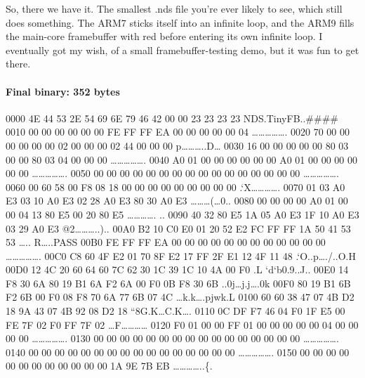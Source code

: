 \documentclass[11pt,a4paper]{article}
\let\oldparagraph\paragraph
\renewcommand{\paragraph}[1]{\oldparagraph{#1}\mbox{}}
\begin{document}
So, there we have it. The smallest .nds file you're ever likely to see,
which still does something. The ARM7 sticks itself into an infinite
loop, and the ARM9 fills the main-core framebuffer with red before
entering its own infinite loop. I eventually got my wish, of a small
framebuffer-testing demo, but it was fun to get there.

\paragraph{Final binary: 352 bytes}\label{final-binary-352-bytes}

0000 4E 44 53 2E 54 69 6E 79 46 42 00 00 23 23 23 23
NDS.TinyFB..\#\#\#\# 0010 00 00 00 00 00 00 {FE FF FF EA} 00 00 00 00 00
04 \ldots{}\ldots{}\ldots{}\ldots{}\ldots{}. 0020 70 00 00 00 00 00 00
02 00 00 00 02 44 00 00 00 p\ldots{}\ldots{}\ldots{}..D\ldots{} 0030 16
00 00 00 00 00 80 03 00 00 80 03 04 00 00 00
\ldots{}\ldots{}\ldots{}\ldots{}\ldots{}. 0040 A0 01 00 00 00 00 00 00
A0 01 00 00 00 00 00 00 \ldots{}\ldots{}\ldots{}\ldots{}\ldots{}. 0050
00 00 00 00 00 00 00 00 00 00 00 00 00 00 00 00
\ldots{}\ldots{}\ldots{}\ldots{}\ldots{}. 0060 00 60 58 00 F8 08 18 00
00 00 00 00 00 00 00 00 .`X\ldots{}\ldots{}\ldots{}\ldots{}. 0070 {01 03
A0 E3 03 10 A0 E3 02 28 A0 E3 80 30 A0 E3}
\ldots{}\ldots{}\ldots{}(\ldots{}0.. 0080 00 00 00 00 A0 01 00 00 {04 13
80 E5 00 20 80 E5} \ldots{}\ldots{}\ldots{}\ldots{}. .. 0090 {40 32 80
E5 1A 05 A0 E3 1F 10 A0 E3 03 29 A0 E3} @2\ldots{}\ldots{}\ldots{}..)..
00A0 {B2 10 C0 E0 01 20 52 E2 FC FF FF 1A} 50 41 53 53 \ldots{}..
R\ldots{}..PASS 00B0 {FE FF FF EA} 00 00 00 00 00 00 00 00 00 00 00 00
\ldots{}\ldots{}\ldots{}\ldots{}\ldots{}. 00C0 C8 60 4F E2 01 70 8F E2
17 FF 2F E1 12 4F 11 48 .`O..p\ldots{}./..O.H 00D0 12 4C 20 60 64 60 7C
62 30 1C 39 1C 10 4A 00 F0 .L `d`\textbar{}b0.9..J.. 00E0 14 F8 30 6A 80
19 B1 6A F2 6A 00 F0 0B F8 30 6B ..0j\ldots{}j.j\ldots{}.0k 00F0 80 19
B1 6B F2 6B 00 F0 08 F8 70 6A 77 6B 07 4C \ldots{}k.k\ldots{}.pjwk.L
0100 60 60 38 47 07 4B D2 18 9A 43 07 4B 92 08 D2 18
``8G.K\ldots{}C.K\ldots{}. 0110 0C DF F7 46 04 F0 1F E5 00 FE 7F 02 F0
FF 7F 02 \ldots{}F\ldots{}\ldots{}\ldots{}\ldots{} 0120 F0 01 00 00 FF
01 00 00 00 00 00 04 00 00 00 00
\ldots{}\ldots{}\ldots{}\ldots{}\ldots{}. 0130 00 00 00 00 00 00 00 00
00 00 00 00 00 00 00 00 \ldots{}\ldots{}\ldots{}\ldots{}\ldots{}. 0140
00 00 00 00 00 00 00 00 00 00 00 00 00 00 00 00
\ldots{}\ldots{}\ldots{}\ldots{}\ldots{}. 0150 00 00 00 00 00 00 00 00
00 00 00 00 1A 9E 7B EB \ldots{}\ldots{}\ldots{}\ldots{}..\{.
\end{document}
